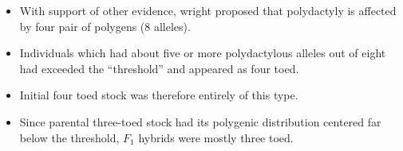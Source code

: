 \documentclass[11pt,dvipsnames,ignorenonframetext,aspectratio=169]{beamer}
\providecommand{\tightlist}{%
  \setlength{\itemsep}{0pt}\setlength{\parskip}{0pt}}
\begin{document}
\begin{frame}{}
\protect\hypertarget{section-14}{}
\begin{itemize}
\tightlist
\item
  With support of other evidence, wright proposed that polydactyly is
  affected by four pair of polygens (8 alleles).
\item
  Individuals which had about five or more polydactylous alleles out of
  eight had exceeded the ``threshold'' and appeared as four toed.
\item
  Initial four toed stock was therefore entirely of this type.
\item
  Since parental three-toed stock had its polygenic distribution
  centered far below the threshold, \(F_1\) hybrids were mostly three
  toed.
\end{itemize}
\end{frame}
\end{document}
